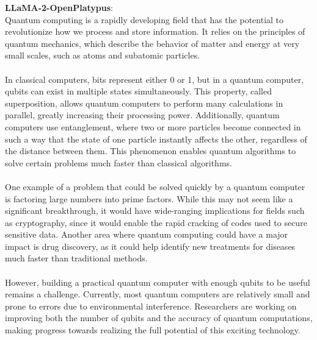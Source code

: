 \documentclass{article} %
\newcommand{\llama}{LLaMA}
\begin{document}
\begin{tcolorbox}[breakable,boxrule=0pt]
  \textbf{\llama{}-2-OpenPlatypus}:\\ Quantum computing is a rapidly developing field that has the potential to revolutionize how we process and store information. It relies on the principles of quantum mechanics, which describe the behavior of matter and energy at very small scales, such as atoms and subatomic particles.\\\\In classical computers, bits represent either 0 or 1, but in a quantum computer, qubits can exist in multiple states simultaneously. This property, called superposition, allows quantum computers to perform many calculations in parallel, greatly increasing their processing power. Additionally, quantum computers use entanglement, where two or more particles become connected in such a way that the state of one particle instantly affects the other, regardless of the distance between them. This phenomenon enables quantum algorithms to solve certain problems much faster than classical algorithms.\\\\One example of a problem that could be solved quickly by a quantum computer is factoring large numbers into prime factors. While this may not seem like a significant breakthrough, it would have wide-ranging implications for fields such as cryptography, since it would enable the rapid cracking of codes used to secure sensitive data. Another area where quantum computing could have a major impact is drug discovery, as it could help identify new treatments for diseases much faster than traditional methods.\\\\However, building a practical quantum computer with enough qubits to be useful remains a challenge. Currently, most quantum computers are relatively small and prone to errors due to environmental interference. Researchers are working on improving both the number of qubits and the accuracy of quantum computations, making progress towards realizing the full potential of this exciting technology.

\end{tcolorbox}
\end{document}

